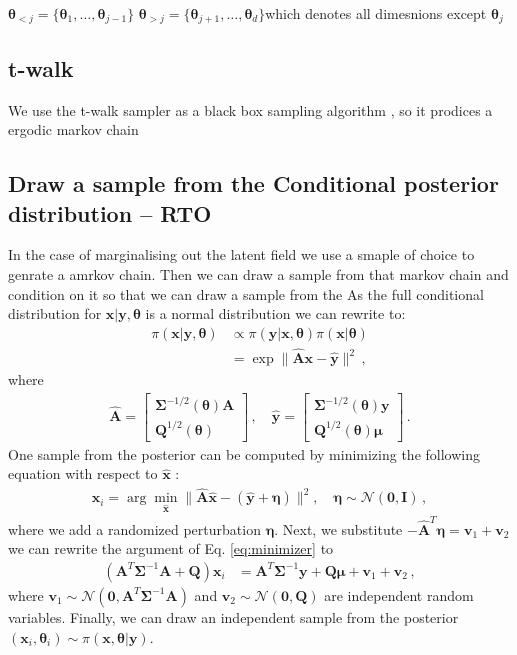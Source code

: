 $ \bm{\theta}_{<j} = \{\bm{\theta}_{1}, \dots, \bm{\theta}_{j-1} \} $ 
$ \bm{\theta}_{>j} = \{\bm{\theta}_{j+1}, \dots, \bm{\theta}_{d}\} $which denotes all dimesnions except $ \bm{\theta}_{j}$
\subsection{t-walk}
We use the t-walk sampler as a black box sampling algorithm
\cite{}, so it prodices a ergodic markov chain


\subsection{Draw a sample from the Conditional posterior distribution -- RTO}
In the case of marginalising out the latent field we use a smaple of choice to genrate a amrkov chain.
Then we can draw a sample from that markov chain and condition on it so that we can draw a sample from the 
As the full conditional distribution for $\bm{x}| \bm{y} , \bm{\theta} $ is a normal distribution we can rewrite to:
\begin{align}
	\pi(\bm{x}|\bm{y}, \bm{\theta} ) &\propto \pi(\bm{y} | \bm{x} , \bm{\theta} ) \pi(\bm{x}| \bm{\theta}) \\
	&= \exp  \lVert \hat{\bm{A}} \bm{x} - \hat{\bm{y}} \rVert^2 \, ,
\end{align}
where 
\begin{align}
	\label{eq:minimizer}
	\hat{\bm{A}} = 
	\begin{bmatrix}
		\bm{\Sigma}^{-1/2}(\bm{\theta})  \bm{A}\\
		\bm{Q}^{1/2}(\bm{\theta}) 
	\end{bmatrix} \, , \quad \hat{\bm{y}} = 
	\begin{bmatrix}
		\bm{\Sigma}^{-1/2}(\bm{\theta})  \bm{y} \\
		\bm{Q}^{1/2}(\bm{\theta}) \bm{\mu}
	\end{bmatrix} \, .
\end{align}
One sample from the posterior can be computed by minimizing the following equation with respect to $\hat{\bm{x}}$ :
\begin{align}
	\bm{x}_i = \arg \min_{\hat{\bm{x}}} \lVert \hat{\bm{A}} \hat{\bm{x}} - ( \hat{\bm{y}} + \bm{\eta} ) \rVert^2 , \quad \bm{\eta} \sim \mathcal{N}(\bm{0}, \mathbf{I}) \, ,
\end{align}
where we add a randomized perturbation $\bm{\eta}$.
Next, we substitute $ - \hat{\bm{A}}^T  \bm{\eta}  = \bm{v}_1 + \bm{v}_2$ we can rewrite the argument of Eq. \ref{eq:minimizer} to 
\begin{align}
	\label{eq:RTO}
	(\bm{A}^T \bm{\Sigma}^{-1} \bm{A}+
	\bm{Q} ) \bm{x}_i &= \bm{A}^T \bm{\Sigma}^{-1} \bm{y} +  \bm{Q} \bm{\mu} + \bm{v}_1 + \bm{v}_2 \,  ,
\end{align}
where $\bm{v}_1 \sim \mathcal{N}(\bm{0}, \bm{A}^T \bm{\Sigma}^{-1} \bm{A}) $ and $\bm{v}_2 \sim \mathcal{N}(\bm{0}, \bm{Q} )$ are independent random variables.
Finally, we can draw an independent sample from the posterior $(\bm{x}_i, \bm{\theta}_i) \sim \pi(\bm{x}, \bm{\theta} | \bm{y})$.



